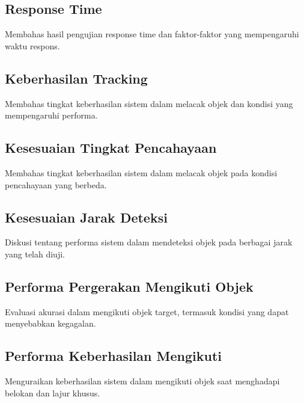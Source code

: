 \subsection{Response Time}
\label{sec:responsetime}

Membahas hasil pengujian response time dan faktor-faktor yang mempengaruhi waktu respons.

\subsection{Keberhasilan Tracking}
\label{sec:performatracking}

Membahas tingkat keberhasilan sistem dalam melacak objek dan kondisi yang mempengaruhi performa.

\subsection{Kesesuaian Tingkat Pencahayaan}
\label{sec:kesesuaianpencahayaan}

Membahas tingkat keberhasilan sistem dalam melacak objek pada kondisi pencahayaan yang berbeda.

\subsection{Kesesuaian Jarak Deteksi}
\label{sec:kesesuaianjarak}

Diskusi tentang performa sistem dalam mendeteksi objek pada berbagai jarak yang telah diuji.

\subsection{Performa Pergerakan Mengikuti Objek}
\label{sec:akurasiikutiobjek}

Evaluasi akurasi dalam mengikuti objek target, termasuk kondisi yang dapat menyebabkan kegagalan.

\subsection{Performa Keberhasilan Mengikuti}
\label{sec:keberhasilanmengikuti}

Menguraikan keberhasilan sistem dalam mengikuti objek saat menghadapi belokan dan lajur khusus.